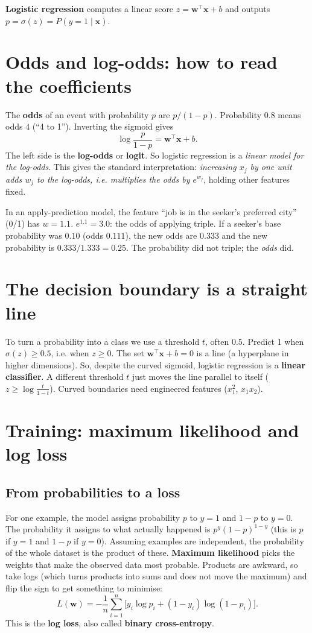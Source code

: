\textbf{Logistic regression} computes a linear score $z = \mathbf w^\top\mathbf x + b$ and outputs
$p = \sigma(z) = P(y = 1\mid \mathbf x)$.

\section{Odds and log-odds: how to read the coefficients}

The \textbf{odds} of an event with probability $p$ are $p/(1-p)$. Probability 0.8 means odds $4$ (``4 to 1'').
Inverting the sigmoid gives
\[ \log\frac{p}{1-p} = \mathbf w^\top\mathbf x + b. \]
The left side is the \textbf{log-odds} or \textbf{logit}. So logistic regression is a \emph{linear model for
the log-odds}. This gives the standard interpretation: \emph{increasing $x_j$ by one unit adds $w_j$ to the
log-odds, i.e. multiplies the odds by $e^{w_j}$}, holding other features fixed.

\begin{example}
In an apply-prediction model, the feature ``job is in the seeker's preferred city'' (0/1) has $w = 1.1$.
$e^{1.1} = 3.0$: the odds of applying triple. If a seeker's base probability was $0.10$ (odds $0.111$), the
new odds are $0.333$ and the new probability is $0.333/1.333 = 0.25$. The probability did not triple; the
\emph{odds} did.
\end{example}

\section{The decision boundary is a straight line}
To turn a probability into a class we use a threshold $t$, often $0.5$. Predict 1 when $\sigma(z)\ge0.5$, i.e.
when $z \ge 0$. The set $\mathbf w^\top\mathbf x + b = 0$ is a line (a hyperplane in higher dimensions). So,
despite the curved sigmoid, logistic regression is a \textbf{linear classifier}. A different threshold $t$ just
moves the line parallel to itself ($z \ge \log\frac{t}{1-t}$). Curved boundaries need engineered features
($x_1^2$, $x_1x_2$).

\section{Training: maximum likelihood and log loss}

\subsection{From probabilities to a loss}
For one example, the model assigns probability $p$ to $y = 1$ and $1-p$ to $y = 0$. The probability it assigns
to what actually happened is $p^y(1-p)^{1-y}$ (this is $p$ if $y=1$ and $1-p$ if $y = 0$). Assuming examples
are independent, the probability of the whole dataset is the product of these. \textbf{Maximum likelihood} picks
the weights that make the observed data most probable. Products are awkward, so take logs (which turns
products into sums and does not move the maximum) and flip the sign to get something to minimise:
\[ L(\mathbf w) = -\frac1n\sum_{i=1}^n\Big[y_i\log p_i + (1-y_i)\log(1-p_i)\Big]. \]
This is the \textbf{log loss}, also called \textbf{binary cross-entropy}.

